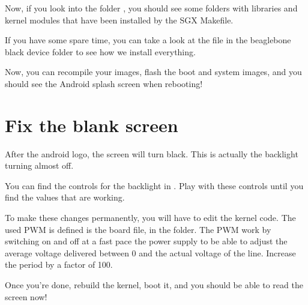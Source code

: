 Now, if you look into the folder ,
you should see some folders with libraries and kernel modules that
have been installed by the SGX Makefile.

If you have some spare time, you can take a look at the file
 in the beaglebone black device folder to see how
we install everything.

Now, you can recompile your images, flash the boot and system images,
and you should see the Android splash screen when rebooting!

\section{Fix the blank screen}

After the android logo, the screen will turn black. This is actually
the backlight turning almost off.

You can find the controls for the backlight in
. Play with these controls until you find
the values that are working.

To make these changes permanently, you will have to edit the kernel
code. The used PWM is defined is the  board file, in
the  folder. The PWM work by switching on
and off at a fast pace the power supply to be able to adjust the
average voltage delivered between 0 and the actual voltage of the
line. Increase the period by a factor of 100.

Once you're done, rebuild the kernel, boot it, and you should be able
to read the screen now!

